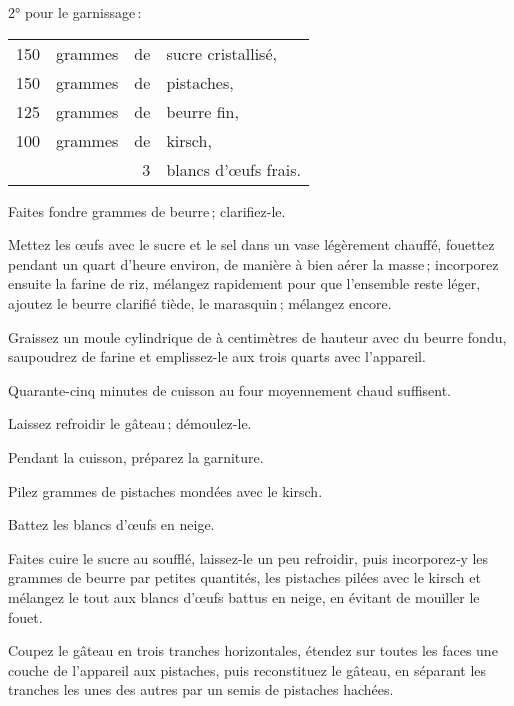2° pour le garnissage :

\footnotesize
\begin{longtable}{rrrp{16em}}
    150 & grammes & de & sucre cristallisé,                                                               \\
    150 & grammes & de & pistaches,                                                                       \\
    125 & grammes & de & beurre fin,                                                                      \\
    100 & grammes & de & kirsch,                                                                          \\
        &         &  3 & blancs d'œufs frais.                                                             \\
\end{longtable}
\normalsize

Faites fondre {\mmm} grammes de beurre ; clarifiez-le.

Mettez les œufs avec le sucre et le sel dans un vase légèrement chauffé,
fouettez pendant un quart d'heure environ, de manière à bien aérer la masse ;
incorporez ensuite la farine de riz, mélangez rapidement pour que l'ensemble
reste léger, ajoutez le beurre clarifié tiède, le marasquin ; mélangez encore.

Graissez un moule cylindrique de {\mmm} à {\mmm} centimètres de
hauteur avec du beurre fondu, saupoudrez de farine et emplissez-le aux trois
quarts avec l'appareil.

Quarante-cinq minutes de cuisson au four moyennement chaud suffisent.

Laissez refroidir le gâteau ; démoulez-le.

Pendant la cuisson, préparez la garniture.

Pilez {\mmm} grammes de pistaches mondées avec le kirsch.

Battez les blancs d'œufs en neige.

Faites cuire le sucre au soufflé, laissez-le un peu refroidir, puis
incorporez‑y les {\mmm} grammes de beurre par petites quantités, les
pistaches pilées avec le kirsch et mélangez le tout aux blancs d'œufs battus en
neige, en évitant de mouiller le fouet.

Coupez le gâteau en trois tranches horizontales, étendez sur toutes les faces
une couche de l'appareil aux pistaches, puis reconstituez le gâteau, en
séparant les tranches les unes des autres par un semis de pistaches hachées.


